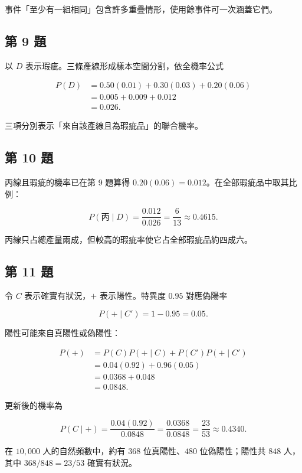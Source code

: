 \documentclass[11pt,a4paper]{article}
\begin{document}
事件「至少有一組相同」包含許多重疊情形，使用餘事件可一次涵蓋它們。

\subsection{第 9 題}\label{ux7b2c-9-ux984c}

以 \(D\) 表示瑕疵。三條產線形成樣本空間分割，依全機率公式

\[
\begin{aligned}
P(D)
&=0.50(0.01)+0.30(0.03)+0.20(0.06)\\
&=0.005+0.009+0.012\\
&=\boxed{0.026}.
\end{aligned}
\]

三項分別表示「來自該產線且為瑕疵品」的聯合機率。

\subsection{第 10 題}\label{ux7b2c-10-ux984c}

丙線且瑕疵的機率已在第 9 題算得 \(0.20(0.06)=0.012\)。在全部瑕疵品中取其比例：

\[
P(\text{丙}\mid D)
=\frac{0.012}{0.026}
=\boxed{\frac6{13}\approx0.4615}.
\]

丙線只占總產量兩成，但較高的瑕疵率使它占全部瑕疵品約四成六。

\subsection{第 11 題}\label{ux7b2c-11-ux984c}

令 \(C\) 表示確實有狀況，\(+\) 表示陽性。特異度 \(0.95\) 對應偽陽率

\[
P(+\mid C')=1-0.95=0.05.
\]

陽性可能來自真陽性或偽陽性：

\[
\begin{aligned}
P(+)
&=P(C)P(+\mid C)+P(C')P(+\mid C')\\
&=0.04(0.92)+0.96(0.05)\\
&=0.0368+0.048\\
&=\boxed{0.0848}.
\end{aligned}
\]

更新後的機率為

\[
P(C\mid +)
=\frac{0.04(0.92)}{0.0848}
=\frac{0.0368}{0.0848}
=\boxed{\frac{23}{53}\approx0.4340}.
\]

在 \(10{,}000\) 人的自然頻數中，約有 \(368\) 位真陽性、\(480\) 位偽陽性；陽性共 \(848\) 人，其中 \(368/848=23/53\) 確實有狀況。
\end{document}

